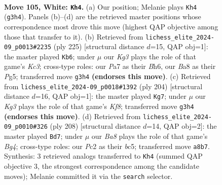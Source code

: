 \documentclass[11pt]{article}
\begin{document}
\clearpage

\begin{figure}[p]\centering
\begin{subfigure}{0.46\textwidth}\centering
\resizebox{\linewidth}{!}{%
\newchessgame
\chessboard[
  setfen={B1n5/P5k1/8/6P1/8/6KP/2P5/8 w - - 1 105},
  showmover=false,
  pgfstyle=straightmove, color=movearrow, markmove={g3-h4}
]}
\caption{}
\end{subfigure}\hfill
\begin{subfigure}{0.46\textwidth}\centering
\resizebox{\linewidth}{!}{%
\newchessgame
\chessboard[
  setfen={8/8/2k4b/pp4pp/8/8/8/1K6 b - - 17 113},
  showmover=false,
  pgfstyle=straightmove, color=movearrow, markmove={c6-b6}
]}
\caption{}
\end{subfigure}
\\[4pt]
\begin{subfigure}{0.46\textwidth}\centering
\resizebox{\linewidth}{!}{%
\newchessgame
\chessboard[
  setfen={5K2/2P2P2/p7/8/5k2/P7/8/8 w - - 0 103},
  showmover=false,
  pgfstyle=straightmove, color=movearrow, markmove={f8-g7}
]}
\caption{}
\end{subfigure}\hfill
\begin{subfigure}{0.46\textwidth}\centering
\resizebox{\linewidth}{!}{%
\newchessgame
\chessboard[
  setfen={8/5k2/8/2b1P3/4K1B1/8/6P1/8 w - - 9 105},
  showmover=false,
  pgfstyle=straightmove, color=movearrow, markmove={g4-d7}
]}
\caption{}
\end{subfigure}
\caption{\textbf{Move 105, White: \texttt{Kh4}.} (a) Our position; Melanie plays \texttt{Kh4} (\texttt{g3h4}). Panels (b)--(d) are the retrieved master positions whose correspondence most drove this move (highest QAP objective among those that transfer to it). (b) Retrieved from \texttt{lichess\_elite\_2024-09\_p0013\#2235} (ply 225) [structural distance $d$=15, QAP obj=1]: the master played \texttt{Kb6}; under $\mu$ our \emph{Kg3} plays the role of that game's \emph{Kc3}; cross-type roles: our \emph{P}a7 as their \emph{B}h6, our \emph{B}a8 as their \emph{P}g5; transferred move \texttt{g3h4} \textbf{(endorses this move)}. (c) Retrieved from \texttt{lichess\_elite\_2024-09\_p0018\#1392} (ply 204) [structural distance $d$=16, QAP obj=1]: the master played \texttt{Kg7}; under $\mu$ our \emph{Kg3} plays the role of that game's \emph{Kf8}; transferred move \texttt{g3h4} \textbf{(endorses this move)}. (d) Retrieved from \texttt{lichess\_elite\_2024-09\_p0010\#326} (ply 208) [structural distance $d$=14, QAP obj=2]: the master played \texttt{Bd7}; under $\mu$ our \emph{Ba8} plays the role of that game's \emph{Bg4}; cross-type roles: our \emph{P}c2 as their \emph{b}c5; transferred move \texttt{a8b7}. Synthesis: 3 retrieved analogs transferred to \texttt{Kh4} (summed QAP objective 3, the strongest correspondence among the candidate moves); Melanie committed it via the \texttt{search} selector.}
\label{fig:thought-m208}
\end{figure}
\end{document}
